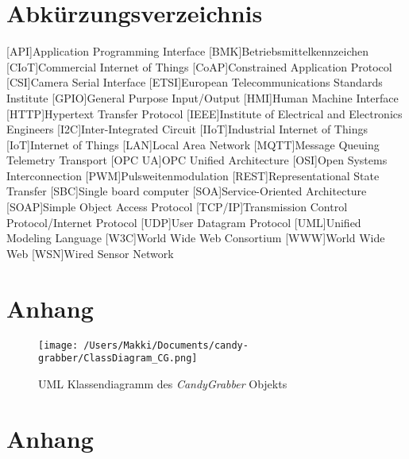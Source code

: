 \documentclass[BMR,Bachelor,ngerman]{twbook}%
\providecommand\listacroname{}
\renewcommand\listacroname{List of Abbreviations}
\renewcommand\listacroname{Abkürzungsverzeichnis}
\begin{document}
\chapter*{\listacroname}
\begin{acronym}[XXXXX]
	[API]{Application Programming Interface}
	[BMK]{Betriebsmittelkennzeichen}
	[CIoT]{Commercial Internet of Things}
	[CoAP]{Constrained Application Protocol}
	[CSI]{Camera Serial Interface}
	[ETSI]{European Telecommunications Standards Institute}
	[GPIO]{General Purpose Input/Output}
	[HMI]{Human Machine Interface}
	[HTTP]{Hypertext Transfer Protocol}
	[IEEE]{Institute of Electrical and Electronics Engineers}
	[I2C]{Inter-Integrated Circuit}
	[IIoT]{Industrial Internet of Things}
	[IoT]{Internet of Things}
	[LAN]{Local Area Network}
   	[MQTT]{Message Queuing Telemetry Transport}
	[OPC UA]{OPC Unified Architecture}
   	[OSI]{Open Systems Interconnection}
	[PWM]{Pulsweitenmodulation}
	[REST]{Representational State Transfer}
	[SBC]{Single board computer}
   	[SOA]{Service-Oriented Architecture}
	[SOAP]{Simple Object Access Protocol}
   	[TCP/IP]{Transmission Control Protocol/Internet Protocol}
	[UDP]{User Datagram Protocol}
	[UML]{Unified Modeling Language}
	[W3C]{World Wide Web Consortium}
   	[WWW]{World Wide Web}
   	[WSN]{Wired Sensor Network}
\end{acronym}

%
%
\appendix
\chapter{Anhang}
\begin{figure}[H]
\centering
\texttt{[image: /Users/Makki/Documents/candy-grabber/ClassDiagram\_CG.png]}
\caption{UML Klassendiagramm des \emph{CandyGrabber} Objekts}\label{fig:uml_class}
\end{figure}
%
\clearpage
\chapter{Anhang}
\end{document}
